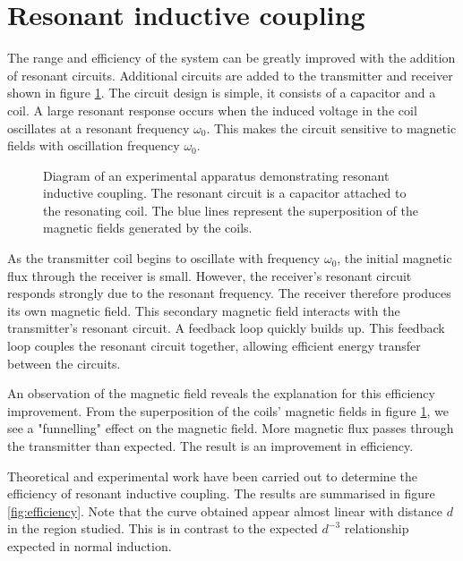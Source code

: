 \documentclass[a4paper,justified,nobib]{tufte-handout}
\begin{document}
\section{Resonant inductive coupling}

The range and efficiency of the system can be greatly improved with the addition of
resonant circuits.
Additional circuits are added to the transmitter and receiver shown in figure
\ref{fig:setupresonance}.
The circuit design is simple, it consists of a capacitor and a coil.
A large resonant response occurs when the induced voltage in the coil oscillates
at a resonant frequency $\omega_0$.
This makes the circuit sensitive to magnetic fields with oscillation
frequency $\omega_0$.

\begin{figure}
  \center
  
  \caption{Diagram of an experimental apparatus demonstrating resonant inductive coupling.
    The resonant circuit is a capacitor attached to the resonating coil.
    The blue lines represent the superposition of the magnetic fields generated by the coils.}
    \label{fig:setupresonance}
\end{figure}


As the transmitter coil begins to oscillate with frequency $\omega_0$,
the initial magnetic flux through the receiver is small.
However, the receiver's resonant circuit responds strongly due to the resonant frequency.
The receiver therefore produces its own magnetic field.
This secondary magnetic field interacts with the transmitter's resonant circuit.
A feedback loop quickly builds up.
This feedback loop couples the resonant circuit together,
allowing efficient energy transfer between the circuits.

An observation of the magnetic field reveals the explanation for this efficiency improvement.
From the superposition of the coils' magnetic fields in figure 
\ref{fig:setupresonance},
we see a "funnelling" effect on the magnetic field.
More magnetic flux passes
through the transmitter than expected.
The result is an improvement in efficiency.\cite{Efficient}

Theoretical\cite{Efficient} and experimental\cite{StrongCouple} work have been carried out to determine the
efficiency of resonant inductive coupling.
The results are summarised in figure \ref{fig:efficiency}.
Note that the curve obtained appear almost linear with distance $d$
in the region studied.
This is in contrast to the expected $d^{-3}$ relationship expected in normal induction.
\end{document}
